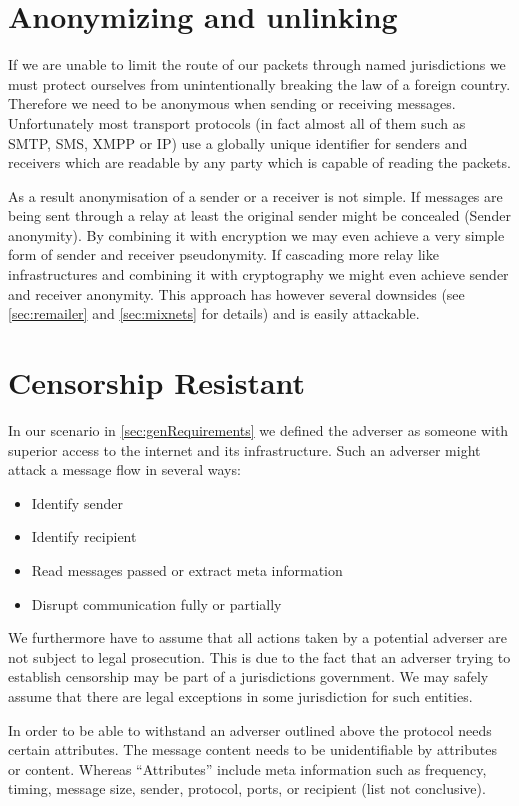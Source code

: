 \section{Anonymizing and unlinking}
If we are unable to limit the route of our packets through named jurisdictions we must protect ourselves from unintentionally breaking the law of a foreign country. Therefore we need to be anonymous when sending or receiving messages. Unfortunately most transport protocols (in fact almost all of them such as SMTP, SMS, XMPP or IP) use a globally unique identifier for senders and receivers which are readable by any party which is capable of reading the packets. 

As a result anonymisation of a sender or a receiver is not simple. If messages are being sent through a relay at least the original sender might be concealed (Sender anonymity). By combining it with encryption we may even achieve a very simple form of sender and receiver pseudonymity. If cascading more relay like infrastructures and combining it with cryptography we might even achieve sender and receiver anonymity. This approach has however several downsides (see \ref{sec:remailer} and \ref{sec:mixnets} for details) and is easily attackable.

\section{Censorship Resistant}
In our scenario in \ref{sec:genRequirements} we defined the adverser as someone with superior access to the internet and its infrastructure. Such an adverser might attack a message flow in several ways:
\begin{itemize}
	\item Identify sender
	\item Identify recipient
	\item Read messages passed or extract meta information
	\item Disrupt communication fully or partially
\end{itemize}

We furthermore have to assume that all actions taken by a potential adverser are not subject to legal prosecution. This is due to the fact that an adverser trying to establish censorship may be part of a jurisdictions government. We may safely assume that there are legal exceptions in some jurisdiction for such entities.

In order to be able to withstand an adverser outlined above the protocol needs certain attributes. The message content needs to be unidentifiable by attributes or content. Whereas ``Attributes'' include meta information such as frequency, timing, message size, sender, protocol, ports, or recipient (list not conclusive).

